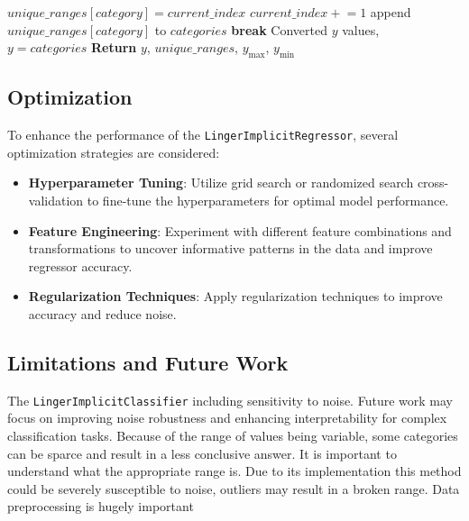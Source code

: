 \documentclass[a4paper, 12pt]{report}
\begin{document}
\begin{algorithm}[H]
\begin{algorithmic}
                            \State $unique\_ranges[category] = current\_index$
                            \State $current\_index \mathrel{+}= 1$
                        \EndIf
                        \State append $unique\_ranges[category]$ to $categories$
                        \State \textbf{break}
                    \EndIf
                \EndIf
            \EndFor
        \EndFor
        \State Converted $y$ values, $y = categories$
        \State \textbf{Return} $y$, $unique\_ranges$, $y_{\text{max}}$, $y_{\text{min}}$
    \end{algorithmic}
\end{algorithm}

\subsection{Optimization}
To enhance the performance of the \texttt{LingerImplicitRegressor}, several optimization strategies are considered:
\begin{itemize}
    \item \textbf{Hyperparameter Tuning}: Utilize grid search or randomized search cross-validation to fine-tune the hyperparameters for optimal model performance.
    
    \item \textbf{Feature Engineering}: Experiment with different feature combinations and transformations to uncover informative patterns in the data and improve regressor accuracy.
    
    \item \textbf{Regularization Techniques}: Apply regularization techniques to improve accuracy and reduce noise.
\end{itemize}

\subsection{Limitations and Future Work}
The \texttt{LingerImplicitClassifier} including sensitivity to noise.
Future work may focus on improving noise robustness and enhancing interpretability for complex classification tasks. Because of the range of values being variable, some categories can be sparce and result in a less conclusive answer. It is important to understand 
what the appropriate range is. Due to its implementation this method could be severely susceptible to noise, outliers may result in a broken range. Data preprocessing is hugely important 
\end{document}
